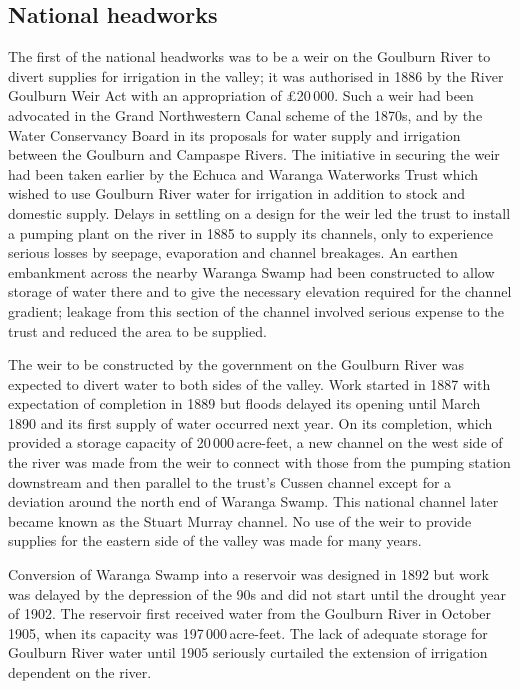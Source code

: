 \subsection*{National headworks} 

The first of the national headworks was to be a weir on the Goulburn
River  to divert supplies for irrigation in the
valley; it was authorised in 1886 by the River Goulburn Weir Act
 with
an appropriation of \pounds20\,000.  Such a weir had been advocated in
the Grand Northwestern Canal scheme  of the 1870s, and by the Water Conservancy Board in its
proposals for water supply and irrigation between the Goulburn and
Campaspe Rivers.  The initiative in securing the weir had been taken
earlier by the Echuca and Waranga Waterworks Trust
 which wished to use
Goulburn River water for irrigation in addition to stock and domestic
supply.  Delays in settling on a design for the weir led the trust to
install a pumping plant on the river in 1885 to supply its channels,
only to experience serious losses by seepage, evaporation and channel
breakages.  An earthen embankment across the nearby Waranga Swamp had
been constructed to allow storage of water there and to give the
necessary elevation required for the channel gradient; leakage from
this section of the channel involved serious expense to the trust and
reduced the area to be supplied.

The weir  to be constructed by the government on
the Goulburn River was expected to divert water to both sides of the
valley.  Work started in 1887 with expectation of completion in 1889
but floods delayed its opening until March 1890 and its first supply
of water occurred next year.  On its completion, which provided a
storage capacity of 20\,000\,ac\-re-feet, a new channel on the west
side of the river was made from the weir to connect with those from
the pumping station downstream and then parallel to the trust's Cussen
channel except for a deviation around the north end of Waranga Swamp.
This national channel later became known as the Stuart Murray channel.
No use of the weir to provide supplies for the eastern side of the
valley was made for many years.

Conversion of Waranga Swamp into a reservoir 
was designed in 1892 but work was delayed by the depression of the 90s
and did not start until the drought year of 1902.  The reservoir first
received water from the Goulburn River  in
October 1905, when its capacity was 197\,000\,acre-feet.  The lack of
adequate storage for Goulburn River water until 1905 seriously
curtailed the extension of irrigation dependent on the
river.

